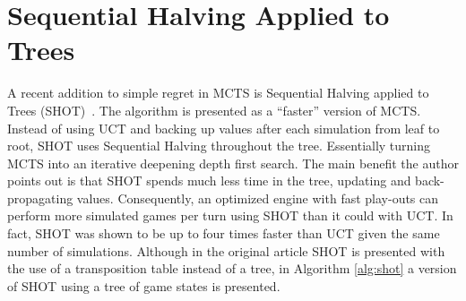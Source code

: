 \documentclass{kecsmstr}
\begin{document}
\section{Sequential Halving Applied to Trees}
\label{sec:SHOT}

A recent addition to simple regret in MCTS is Sequential Halving applied to Trees (SHOT)~. The algorithm is presented as a ``faster'' version of MCTS.  Instead of using UCT and backing up values after each simulation from leaf to root, SHOT uses Sequential Halving throughout the tree. Essentially turning MCTS into an iterative deepening depth first search. The main benefit the author points out is that SHOT spends much less time in the tree, updating and back-propagating values. Consequently, an optimized engine with fast play-outs can perform more simulated games per turn using SHOT than it could with UCT. In fact, SHOT was shown to be up to four times faster than UCT given the same number of simulations. Although in the original article SHOT is presented with the use of a transposition table instead of a tree, in Algorithm \ref{alg:shot} a version of SHOT using a tree of game states is presented.
\end{document}
